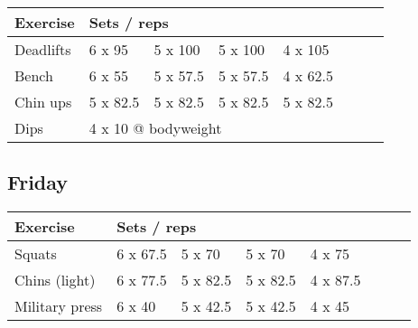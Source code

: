 \documentclass[12pt, a4paper]{article}%
\begin{document}
  \begin{tabular}{l|lllllll}
  \hspace{0.75em} \textbf{Exercise} & \multicolumn{ 7 }{l}{ \textbf{Sets / reps} } \\ \hline

            \hspace{0.75em} Deadlifts
            & 6 x 95
            & 5 x 100
            & 5 x 100
            & 4 x 105
            & 
            & 
            & 
            \\


            \hspace{0.75em} Bench
            & 6 x 55
            & 5 x 57.5
            & 5 x 57.5
            & 4 x 62.5
            & 
            & 
            & 
            \\


            \hspace{0.75em} Chin ups
            & 5 x 82.5
            & 5 x 82.5
            & 5 x 82.5
            & 5 x 82.5
            & 
            & 
            & 
            \\


   \hspace{0.75em} Dips &  \multicolumn{ 7 }{l}{ 4 x 10 @ bodyweight } \\
  \end{tabular}

  \subsection*{\hspace{0.5em} Friday }


  \begin{tabular}{l|lllllll}
  \hspace{0.75em} \textbf{Exercise} & \multicolumn{ 7 }{l}{ \textbf{Sets / reps} } \\ \hline

            \hspace{0.75em} Squats
            & 6 x 67.5
            & 5 x 70
            & 5 x 70
            & 4 x 75
            & 
            & 
            & 
            \\


            \hspace{0.75em} Chins (light)
            & 6 x 77.5
            & 5 x 82.5
            & 5 x 82.5
            & 4 x 87.5
            & 
            & 
            & 
            \\


            \hspace{0.75em} Military press
            & 6 x 40
            & 5 x 42.5
            & 5 x 42.5
            & 4 x 45
            & 
            & 
            & 
            \\


  \end{tabular}
\end{document}
